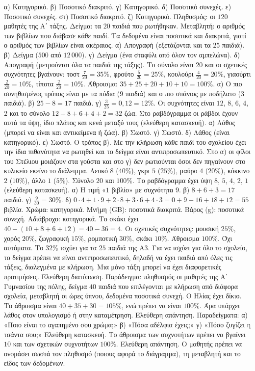  α) Κατηγορικό. β) Ποσοτικό διακριτό. γ) Κατηγορικό. δ) Ποσοτικό συνεχές. ε) Ποσοτικό συνεχές. στ) Ποσοτικό διακριτό. ζ) Κατηγορικό.
 Πληθυσμός: οι $120$ μαθητές της Α΄ τάξης. Δείγμα: τα $20$ παιδιά που ρωτήθηκαν. Μεταβλητή: ο αριθμός των βιβλίων που διάβασε κάθε παιδί. Τα δεδομένα είναι ποσοτικά και διακριτά, γιατί ο αριθμός των βιβλίων είναι ακέραιος.
 α) Απογραφή (εξετάζονται και τα $25$ παιδιά). β) Δείγμα ($500$ από $12\,000$). γ) Δείγμα (ένα σταφύλι από όλον τον αμπελώνα). δ) Απογραφή (μετρούνται όλα τα παιδιά της τάξης).
 Το σύνολο είναι $20$ και οι σχετικές συχνότητες βγαίνουν: τοστ $\frac{7}{20}=35\%$, φρούτο $\frac{5}{20}=25\%$, κουλούρι $\frac{4}{20}=20\%$, γιαούρτι $\frac{2}{20}=10\%$, τίποτα $\frac{2}{20}=10\%$. Άθροισμα: $35+25+20+10+10=100\%$.
 α) Ο πιο συνηθισμένος τρόπος είναι με τα πόδια ($9$ παιδιά) και ο πιο σπάνιος με ποδήλατο ($3$ παιδιά). β) $25-8=17$ παιδιά. γ) $\frac{3}{25}=0{,}12=12\%$.
 Οι συχνότητες είναι $12$, $8$, $6$, $4$, $2$ και το σύνολο $12+8+6+4+2=32$ ζώα. Στο ραβδόγραμμα οι ράβδοι έχουν αυτά τα ύψη, ίδιο πλάτος και κενά μεταξύ τους (ελεύθερη κατασκευή).
 α) Λάθος (μπορεί να είναι και αντικείμενα ή ζώα). β) Σωστό. γ) Σωστό. δ) Λάθος (είναι κατηγορικό). ε) Σωστό.
 Ο τρόπος β). Με την κλήρωση κάθε παιδί του σχολείου έχει την ίδια πιθανότητα να ρωτηθεί και το δείγμα είναι αντιπροσωπευτικό. Στο α) οι φίλοι του Στέλιου μοιάζουν στα γούστα και στο γ) δεν ρωτιούνται όσοι δεν πηγαίνουν στο κυλικείο εκείνο το διάλειμμα.
 Λευκό $8$ ($40\%$), γκρι $5$ ($25\%$), μαύρο $4$ ($20\%$), κόκκινο $2$ ($10\%$), άλλο $1$ ($5\%$). Σύνολο $20$ και $100\%$. Το ραβδόγραμμα έχει ύψη $8$, $5$, $4$, $2$, $1$ (ελεύθερη κατασκευή).
 α) Η τιμή «$1$ βιβλίο» με συχνότητα $9$. β) $8+6+3=17$ παιδιά. γ) $\frac{9}{30}=30\%$. δ) $0\cdot4+1\cdot9+2\cdot8+3\cdot6+4\cdot3=0+9+16+18+12=55$ βιβλία.
 Χρώμα: κατηγορικά. Μνήμη (GB): ποσοτικά διακριτά. Βάρος (g): ποσοτικά συνεχή. Αδιάβροχο: κατηγορικά.
 Το σκάκι έχει $40-(10+8+6+12)=40-36=4$. Οι σχετικές συχνότητες: μουσική $25\%$, χορός $20\%$, ζωγραφική $15\%$, ρομποτική $30\%$, σκάκι $10\%$. Άθροισμα $100\%$.
 Όχι αυτόματα. Το $32\%$ ισχύει για τα $25$ παιδιά της Α$3$. Για να ισχύει για όλο το σχολείο, το δείγμα πρέπει να είναι αντιπροσωπευτικό, δηλαδή να έχει παιδιά από όλες τις τάξεις, διαλεγμένα με κλήρωση. Μια μόνο τάξη μπορεί να έχει διαφορετικές προτιμήσεις.
 Ελεύθερη διατύπωση. Παράδειγμα: πληθυσμός οι μαθητές της Α΄ Γυμνασίου της πόλης, δείγμα $40$ παιδιά που επιλέγονται με κλήρωση από διάφορα σχολεία, μεταβλητή οι ώρες ύπνου, δεδομένα ποσοτικά συνεχή.
 Ο Ηλίας έχει δίκιο. Το άθροισμα είναι $40+35+30=105\%$, ενώ πρέπει να είναι $100\%$. Άρα υπάρχει λάθος στον υπολογισμό ή στην καταμέτρηση.
 Ελεύθερη απάντηση. Παραδείγματα: α) «Ποιο είναι το αγαπημένο σου χρώμα;» β) «Πόσα αδέλφια έχεις;» γ) «Πόσο ζυγίζει η τσάντα σου;»
 Ελεύθερη κατασκευή. Το άθροισμα των συχνοτήτων πρέπει να βγαίνει $10$ και των σχετικών συχνοτήτων $100\%$.
 Ελεύθερη απάντηση. Ο μαθητής πρέπει να ονομάσει σωστά τον πληθυσμό (ποιους αφορά το διάγραμμα), τη μεταβλητή και το είδος των δεδομένων.
